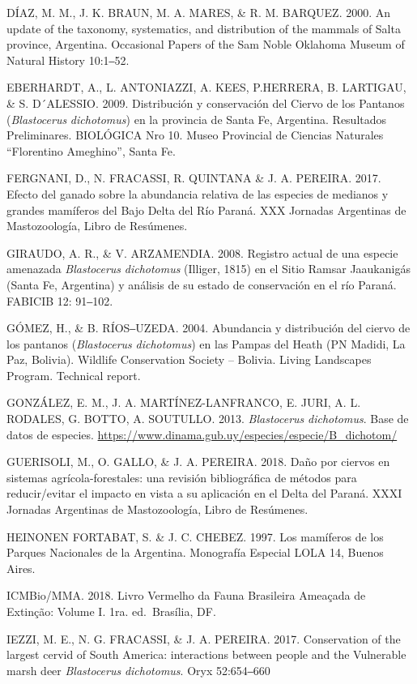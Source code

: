 \documentclass[
  x11names]{article}
\begin{document}
DÍAZ, M. M., J. K. BRAUN, M. A. MARES, \& R. M. BARQUEZ. 2000. An update
of the taxonomy, systematics, and distribution of the mammals of Salta
province, Argentina. Occasional Papers of the Sam Noble Oklahoma Museum
of Natural History 10:1‒52.

EBERHARDT, A., L. ANTONIAZZI, A. KEES, P.HERRERA, B. LARTIGAU, \& S.
D´ALESSIO. 2009. Distribución y conservación del Ciervo de los Pantanos
(\textit{Blastocerus} \textit{dichotomus}) en la provincia de Santa Fe,
Argentina. Resultados Preliminares. BIOLÓGICA Nro 10. Museo Provincial
de Ciencias Naturales ``Florentino Ameghino'', Santa Fe.

FERGNANI, D., N. FRACASSI, R. QUINTANA \& J. A. PEREIRA. 2017. Efecto
del ganado sobre la abundancia relativa de las especies de medianos y
grandes mamíferos del Bajo Delta del Río Paraná. XXX Jornadas Argentinas
de Mastozoología, Libro de Resúmenes.

GIRAUDO, A. R., \& V. ARZAMENDIA. 2008. Registro actual de una especie
amenazada \textit{Blastocerus} \textit{dichotomus} (Illiger, 1815) en el
Sitio Ramsar Jaaukanigás (Santa Fe, Argentina) y análisis de su estado
de conservación en el río Paraná. FABICIB 12: 91‒102.

GÓMEZ, H., \& B. RÍOS‒UZEDA. 2004. Abundancia y distribución del ciervo
de los pantanos (\textit{Blastocerus} \textit{dichotomus}) en las Pampas
del Heath (PN Madidi, La Paz, Bolivia). Wildlife Conservation Society --
Bolivia. Living Landscapes Program. Technical report.

GONZÁLEZ, E. M., J. A. MARTÍNEZ-LANFRANCO, E. JURI, A. L. RODALES, G.
BOTTO, A. SOUTULLO. 2013. \textit{Blastocerus} \textit{dichotomus}. Base
de datos de especies.
\url{https://www.dinama.gub.uy/especies/especie/B_dichotom/}

GUERISOLI, M., O. GALLO, \& J. A. PEREIRA. 2018. Daño por ciervos en
sistemas agrícola-forestales: una revisión bibliográfica de métodos para
reducir/evitar el impacto en vista a su aplicación en el Delta del
Paraná. XXXI Jornadas Argentinas de Mastozoología, Libro de Resúmenes.

HEINONEN FORTABAT, S. \& J. C. CHEBEZ. 1997. Los mamíferos de los
Parques Nacionales de la Argentina. Monografía Especial LOLA 14, Buenos
Aires.

ICMBio/MMA. 2018. Livro Vermelho da Fauna Brasileira Ameaçada de
Extinção: Volume I. 1ra. ed.~Brasília, DF.

IEZZI, M. E., N. G. FRACASSI, \& J. A. PEREIRA. 2017. Conservation of
the largest cervid of South America: interactions between people and the
Vulnerable marsh deer \textit{Blastocerus} \textit{dichotomus}. Oryx
52:654‒660
\end{document}
